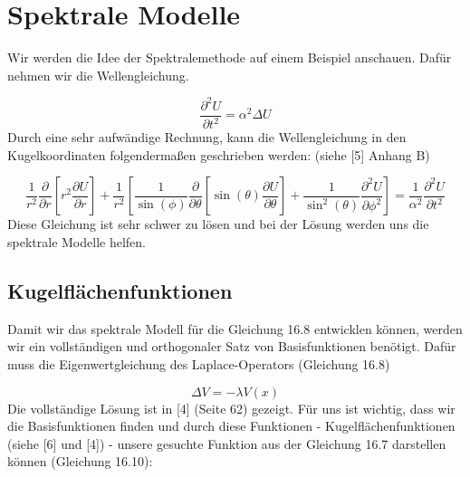 %
%
%
%
\section{Spektrale Modelle 
\label{spektral:section:spektralemodelle}}

Wir werden die Idee der Spektralemethode auf einem Beispiel anschauen. Dafür nehmen wir die Wellengleichung.

\begin{equation}
 \dfrac{\partial^2U}{\partial{t^2}} = \alpha^2\Delta U
\label{spektral:equation7}
\end{equation}
Durch eine sehr aufwändige Rechnung, kann die Wellengleichung in den Kugelkoordinaten folgendermaßen geschrieben werden: (siehe [5] Anhang B)

\begin{equation}
 \frac{1}{r^2}\frac{\partial}{\partial{r}}\left[r^2\frac{\partial{U}}{\partial{r}}\right] + \frac{1}{r^2}\left[\frac{1}{\sin(\phi)}\frac{\partial}{\partial{\theta}}\left[\sin(\theta)\frac{\partial{U}}{\partial{\theta}}\right] + \frac{1}{\sin^2(\theta)}\frac{\partial^2{U}}{\partial{\phi^2}}\right] = \frac{1}{\alpha^2}\frac{\partial^2{U}}{\partial{t^2}}
\label{spektral:equation8}
\end{equation}
Diese Gleichung ist sehr schwer zu lösen und bei der Lösung werden uns die spektrale Modelle helfen.

\subsection{Kugelflächenfunktionen
\label{spektral:subsection:kugelflaechenfunktionen}}

Damit wir das spektrale Modell für die Gleichung 16.8 entwicklen können, werden wir ein vollständigen und orthogonaler Satz von Basisfunktionen benötigt.
Dafür muss die Eigenwertgleichung des Laplace-Operators (Gleichung 16.8)

\begin{equation}
 \Delta{V} = -\lambda{V(x)}
\label{spektral:equation9}
\end{equation}
Die vollständige Lösung ist in [4] (Seite 62) gezeigt.
Für uns ist wichtig, dass wir die Basisfunktionen finden und durch diese Funktionen - Kugelflächenfunktionen (siehe [6] und [4]) - unsere gesuchte Funktion aus der Gleichung 16.7 darstellen können (Gleichung 16.10):

